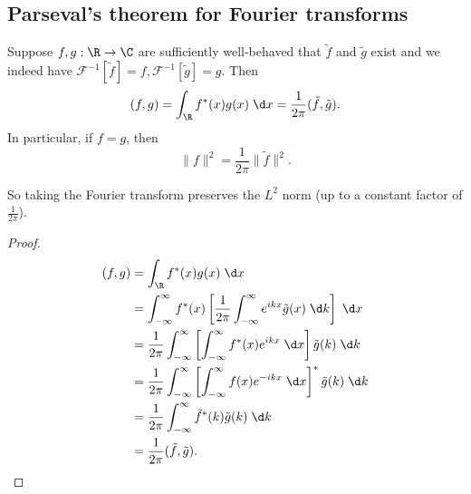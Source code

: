 \documentclass[a4paper]{article}
\begin{document}
\subsection{Parseval's theorem for Fourier transforms}
\begin{thm}
  Suppose $f, g: \R \to \C$ are sufficiently well-behaved that $\tilde{f}$ and $\tilde{g}$ exist and we indeed have $\mathcal{F}^{-1}[\tilde{f}] = f, \mathcal{F}^{-1}[\tilde{g}] = g$. Then
  \[
    (f, g) = \int_\R f^*(x) g(x)\;\d x = \frac{1}{2\pi}(\tilde{f}, \tilde{g}).
  \]
  In particular, if $f = g$, then
  \[
    \|f\|^2 = \frac{1}{2\pi} \|\tilde{f}\|^2.
  \]
\end{thm}
So taking the Fourier transform preserves the $L^2$ norm (up to a constant factor of $\frac{1}{2 \pi}$).
\begin{proof}
  \begin{align*}
    (f, g) &= \int_\R f^*(x) g(x)\;\d x\\
    &= \int_{-\infty}^\infty f^*(x) \left[\frac{1}{2\pi}\int_{-\infty}^\infty e^{ikx} \tilde{g}(x) \;\d k\right]\;\d x\\
    &= \frac{1}{2\pi} \int_{-\infty}^\infty \left[\int_{-\infty}^\infty f^*(x) e^{ikx} \;\d x\right] \tilde{g}(k)\;\d k\\
    &= \frac{1}{2\pi} \int_{-\infty}^\infty \left[\int_{-\infty}^\infty f(x) e^{-ikx} \;\d x\right]^* \tilde{g}(k)\;\d k\\
    &= \frac{1}{2\pi} \int_{-\infty}^\infty \tilde{f}^*(k) \tilde{g}(k) \;\d k\\
    &= \frac{1}{2\pi}(\tilde{f}, \tilde{g}).
  \end{align*}
\end{proof}
\end{document}
